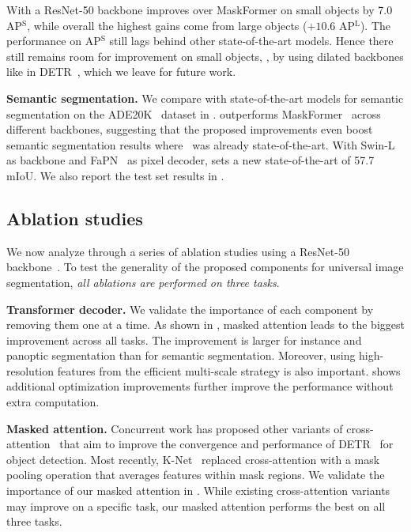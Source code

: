 With a ResNet-50 backbone \modelname  improves over MaskFormer on small objects by 7.0 AP$^\text{S}$, while overall the highest gains come from large objects ($+10.6$ AP$^\text{L}$). The performance on AP$^\text{S}$ still lags behind other state-of-the-art models.
Hence there still remains room for improvement on small objects, \eg, by using dilated backbones like in DETR~\cite{detr}, which we leave for future work.

\noindent\textbf{Semantic segmentation.} We compare \modelname with state-of-the-art models for semantic segmentation on the ADE20K~\cite{zhou2017ade20k} dataset in . \modelname outperforms MaskFormer~\cite{cheng2021maskformer} across different backbones, suggesting that the proposed improvements even boost semantic segmentation results where~\cite{cheng2021maskformer} was already state-of-the-art. With Swin-L as  backbone and FaPN~\cite{fapn} as  pixel decoder, \modelname sets a new state-of-the-art of 57.7 mIoU. We also report the test set results in .


\subsection{Ablation studies}
We now analyze \modelname through a series of ablation studies using a ResNet-50 backbone~\cite{he2016deep}. To test the generality of the proposed components  for universal image segmentation, \emph{all ablations are performed on three tasks}.





\noindent\textbf{Transformer decoder.}
We validate the importance of each component %
by removing them one at a time. As shown in , masked attention leads to the biggest improvement across all tasks. The improvement is larger for %
instance and panoptic segmentation
than for semantic segmentation. Moreover, using high-resolution features from the efficient multi-scale strategy is also important.  shows additional optimization improvements further improve the performance without extra computation.

\noindent\textbf{Masked attention.}
Concurrent work has proposed other variants of cross-attention~\cite{gao2021smca,meng2021cdetr} that aim to improve the convergence and performance of DETR~\cite{detr} for object detection. Most recently, K-Net~\cite{zhang2021knet} replaced cross-attention with a mask pooling operation that averages features within mask regions. We validate the importance of our masked attention in . While existing cross-attention variants may improve on a specific task, our masked attention performs the best on all three tasks.


